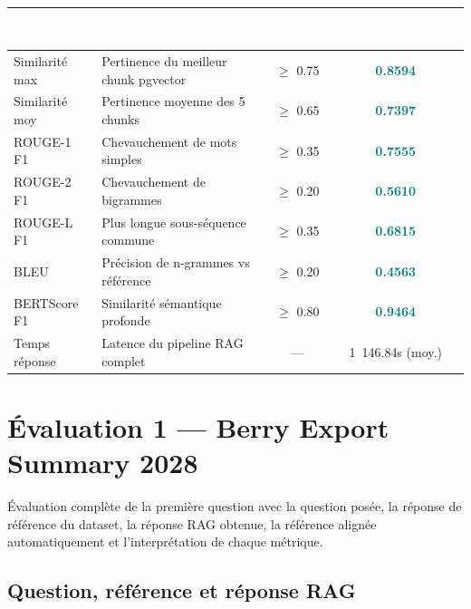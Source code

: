 \documentclass[12pt,a4paper]{report}
\begin{document}
\vspace{8pt}
\begin{center}
\begin{tabular}{|l|p{5.5cm}|c|c|}
  \hline
  \rowcolor{mainblue}
  \textcolor{white}{\textbf{Métrique}} &
  \textcolor{white}{\textbf{Ce qu'elle mesure}} &
  \textcolor{white}{\textbf{Seuil bon}} &
  \textcolor{white}{\textbf{Score moyen (3 questions)}} \\
  \hline
  Similarité max  & Pertinence du meilleur chunk pgvector   & $\geq$ 0.75 & \textcolor{teal}{\textbf{0.8594}} \\
  \rowcolor{lightblue}
  Similarité moy  & Pertinence moyenne des 5 chunks         & $\geq$ 0.65 & \textcolor{teal}{\textbf{0.7397}} \\
  ROUGE-1 F1      & Chevauchement de mots simples           & $\geq$ 0.35 & \textcolor{teal}{\textbf{0.7555}} \\
  \rowcolor{lightblue}
  ROUGE-2 F1      & Chevauchement de bigrammes              & $\geq$ 0.20 & \textcolor{teal}{\textbf{0.5610}} \\
  ROUGE-L F1      & Plus longue sous-séquence commune       & $\geq$ 0.35 & \textcolor{teal}{\textbf{0.6815}} \\
  \rowcolor{lightblue}
  BLEU            & Précision de n-grammes vs référence     & $\geq$ 0.20 & \textcolor{teal}{\textbf{0.4563}} \\
  BERTScore F1    & Similarité sémantique profonde          & $\geq$ 0.80 & \textcolor{teal}{\textbf{0.9464}} \\
  \hline
  Temps réponse   & Latence du pipeline RAG complet         & —           & 1~146.84s (moy.) \\
  \hline
\end{tabular}
\end{center}

\section{Évaluation 1 — Berry Export Summary 2028}

Évaluation complète de la première question avec la question posée,
la réponse de référence du dataset, la réponse RAG obtenue, la référence
alignée automatiquement et l'interprétation de chaque métrique.

\subsection{Question, référence et réponse RAG}
\end{document}
